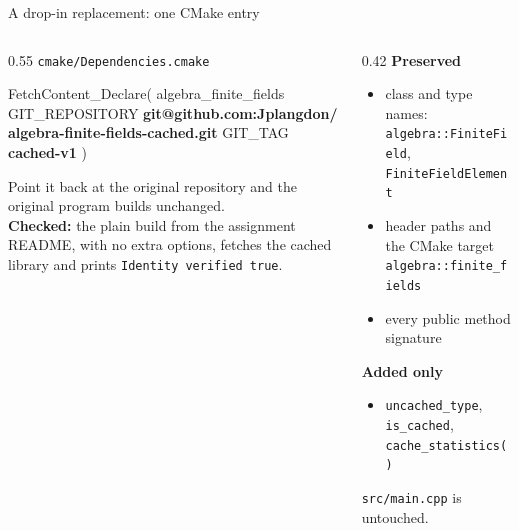 \documentclass[aspectratio=169,11pt]{beamer}
\begin{document}
\begin{frame}[fragile]{A drop-in replacement: one CMake entry}
  \begin{columns}[T]
    \begin{column}{0.55\textwidth}
      \small\texttt{cmake/Dependencies.cmake}
\begin{semiverbatim}\footnotesize
FetchContent_Declare(
    algebra_finite_fields
    GIT_REPOSITORY \textcolor{accent}{\textbf{git@github.com:Jplangdon/}}
      \textcolor{accent}{\textbf{algebra-finite-fields-cached.git}}
    GIT_TAG        \textcolor{accent}{\textbf{cached-v1}}
)
\end{semiverbatim}
      \vspace{0.3em}
      {\footnotesize Point it back at the original repository and the
      original program builds unchanged.}\\[0.5em]
      {\footnotesize\textbf{Checked:} the plain build from the assignment README,
      with no extra options, fetches the cached library and prints
      \texttt{Identity verified true}.}
    \end{column}
    \begin{column}{0.42\textwidth}
      \textbf{Preserved}
      \begin{itemize}\small
        \item class and type names: \texttt{algebra::FiniteField},
              \texttt{FiniteFieldElement}
        \item header paths and the CMake target \texttt{algebra::finite\_fields}
        \item every public method signature
      \end{itemize}
      \textbf{Added only}
      \begin{itemize}\small
        \item \texttt{uncached\_type}, \texttt{is\_cached}, \texttt{cache\_statistics()}
      \end{itemize}
      \texttt{src/main.cpp} is untouched.
    \end{column}
  \end{columns}
\end{frame}
\end{document}

